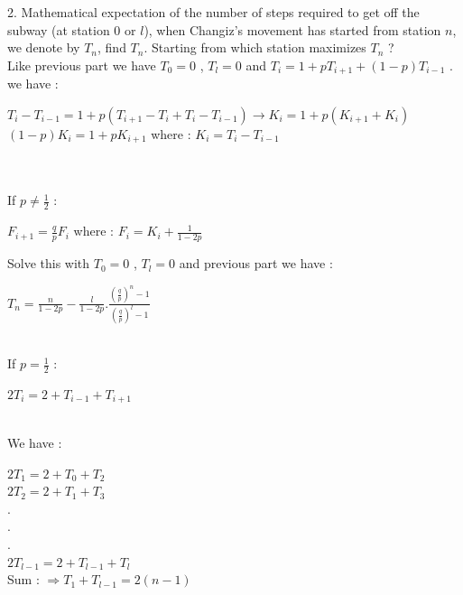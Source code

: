 \documentclass[30pt]{article}
\begin{document}
{\color{blue} {\large 2. }Mathematical expectation of the number of steps required to get off the subway (at station 0 or $l$), when Changiz's movement has started from station $n$, we denote by $T_n$, find $T_n$. Starting from which station maximizes $T_n$ ? } \\ \newline
Like previous part we have $T_0 = 0 $ , $T_l = 0 $ and $T_i = 1 + pT_{i+1} + (1-p)T_{i-1} $ . we have : \\
\begin{center}
    $T_i - T_{i-1} = 1 + p(T_{i+1} - T_i + T_i - T_{i-1}) \rightarrow K_i = 1 + p(K_{i+1} + K_i) $ \vspace{0.2cm} \\
    $(1-p)K_i = 1 + pK_{i+1} $ \hspace{0.4cm} where : $K_i = T_i - T_{i-1} $ \vspace{0.2cm} \\
    $ $
\end{center} \\
If $p \neq \frac{1}{2} $ : \\
\begin{center}
    $F_{i+1} = \frac{q}{p}F_i $ \hspace{0.3cm} where : $F_i = K_i + \frac{1}{1-2p} $ \vspace{0.2cm} \\ 
\end{center}
Solve this with $T_0 = 0 $ , $T_l = 0 $ and previous part we have : \\ 
\begin{center}
    $T_n = \frac{n}{1-2p} - \frac{l}{1-2p} . \frac{(\frac{q}{p})^n - 1}{(\frac{q}{p})^l - 1} $
\end{center} \\
If $p = \frac{1}{2} $ : 
\begin{center}
    $2T_i = 2 + T_{i-1} + T_{i+1} $ 
\end{center} \\
We have : \\ 
\begin{center}
    $2T_1 = 2 + T_0 + T_2 $ \vspace{0.2cm} \\
    $2T_2 = 2 + T_1 + T_3 $ \vspace{0.1cm} \\
    . \vspace{0.05cm} \\
    . \vspace{0.05cm} \\
    . \vspace{0.1cm} \\
    $2T_{l-1} = 2 + T_{l-1} + T_{l} $ \vspace{0.5cm} \\
    Sum : $\Rightarrow T_1 + T_{l-1} = 2(n-1) $
\end{center} \\ 
\end{document}
